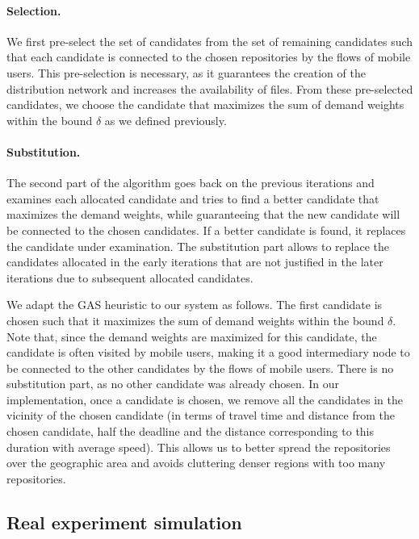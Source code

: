 \paragraph{Selection.} We first pre-select the set of candidates from the set of remaining candidates such that each candidate is connected to the chosen repositories by the flows of mobile users. This pre-selection is necessary, as it guarantees the creation of the distribution network and increases the availability of files. From these pre-selected candidates, we choose the candidate that maximizes the sum of demand weights within the bound $\delta$ as we defined previously. 

\paragraph{Substitution.} The second part of the algorithm goes back on the previous iterations and examines each allocated candidate and tries to find a better candidate that maximizes the demand weights, while guaranteeing that the new candidate will be connected to the chosen candidates. If a better candidate is found, it replaces the candidate under examination. The substitution part allows to replace the candidates allocated in the early iterations that are not justified in the later iterations due to subsequent allocated candidates.

We adapt the GAS heuristic to our system as follows.  The first candidate is chosen such that it maximizes the sum of demand weights within the bound $\delta$. Note that, since the demand weights are maximized for this candidate, the candidate is often visited by mobile users, making it a good intermediary node to be connected to the other candidates by the flows of mobile users. There is no substitution part, as no other candidate was already chosen. In our implementation, once a candidate is chosen, we remove all the candidates in the vicinity of the chosen candidate (in terms of travel time and distance from the chosen candidate, \eg half the deadline and the distance corresponding to this duration with average speed). This allows us to better spread the repositories over the geographic area and avoids cluttering denser regions with too many repositories.

\subsection{Real experiment simulation}
\label{sec:repo-evaluation}


